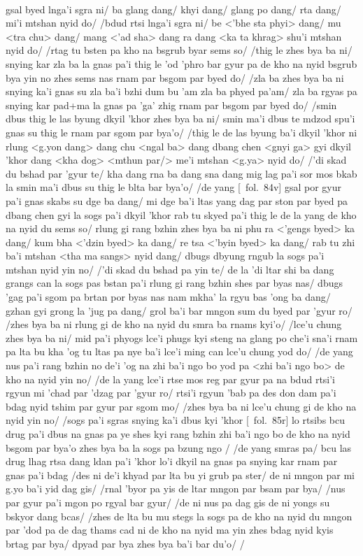 \documentclass[12pt]{article}
\begin{document}
\textbf{\TVB}\\
gsal byed lnga'i sgra ni/ ba glang dang/ khyi dang/ glang po dang/ rta dang/ mi'i mtshan nyid do/ /bdud rtsi lnga'i sgra ni/ be <'bhe sta phyi> dang/ mu <tra chu> dang/ mang <'ad sha> dang ra dang <ka ta khrag> shu'i mtshan nyid do/ /rtag tu bsten pa kho na bsgrub byar sems so/ /thig le zhes bya ba ni/ snying kar zla ba la gnas pa'i thig le 'od 'phro bar gyur pa de kho na nyid bsgrub bya yin no zhes sems nas rnam par bsgom par byed do/ /zla ba zhes bya ba ni snying ka'i gnas su zla ba'i bzhi dum bu 'am zla ba phyed pa'am/ zla ba rgyas pa snying kar pad+ma la gnas pa 'ga' zhig rnam par bsgom par byed do/ /smin dbus thig le las byung dkyil 'khor zhes bya ba ni/ smin ma'i dbus te mdzod spu'i gnas su thig le rnam par sgom par bya'o/ /thig le de las byung ba'i dkyil 'khor ni rlung <g.yon dang> dang chu <ngal ba> dang dbang chen <gnyi ga> gyi dkyil 'khor dang <kha dog> <mthun par/> me'i mtshan <g.ya> nyid do/ /'di skad du bshad par 'gyur te/ kha dang rna ba dang sna dang mig lag pa'i sor mos bkab la smin ma'i dbus su thig le blta bar bya'o/ /de yang [\TVB\ fol.\ 84v] gsal por gyur pa'i gnas skabs su dge ba dang/ mi dge ba'i ltas yang dag par ston par byed pa dbang chen gyi la sogs pa'i dkyil 'khor rab tu skyed pa'i thig le de la yang de kho na nyid du sems so/ rlung gi rang bzhin zhes bya ba ni phu ra <'gengs byed> ka dang/ kum bha <'dzin byed> ka dang/ re tsa <'byin byed> ka dang/ rab tu zhi ba'i mtshan <tha ma sangs> nyid dang/ dbugs dbyung rngub la sogs pa'i mtshan nyid yin no/ /'di skad du bshad pa yin te/ de la 'di ltar shi ba dang grangs can la sogs pas bstan pa'i rlung gi rang bzhin shes par byas nas/ dbugs 'gag pa'i sgom pa brtan por byas nas nam mkha' la rgyu bas 'ong ba dang/ gzhan gyi grong la 'jug pa dang/ grol ba'i bar mngon sum du byed par 'gyur ro/ /zhes bya ba ni rlung gi de kho na nyid du smra ba rnams kyi'o/ /lce'u chung zhes bya ba ni/ mid pa'i phyogs lce'i phugs kyi steng na glang po che'i sna'i rnam pa lta bu kha 'og tu ltas pa nye ba'i lce'i ming can lce'u chung yod do/ /de yang nus pa'i rang bzhin no de'i 'og na zhi ba'i ngo bo yod pa <zhi ba'i ngo bo> de kho na nyid yin no/ /de la yang lce'i rtse mos reg par gyur pa na bdud rtsi'i rgyun mi 'chad par 'dzag par 'gyur ro/ rtsi'i rgyun 'bab pa des don dam pa'i bdag nyid tshim par gyur par sgom mo/ /zhes bya ba ni lce'u chung gi de kho na nyid yin no/ /sogs pa'i sgras snying ka'i dbus kyi 'khor [\TVB\ fol.\ 85r] lo rtsibs bcu drug pa'i dbus na gnas pa ye shes kyi rang bzhin zhi ba'i ngo bo de kho na nyid bsgom par bya'o zhes bya ba la sogs pa bzung ngo / /de yang smras pa/ bcu las drug lhag rtsa dang ldan pa'i 'khor lo'i dkyil na gnas pa snying kar rnam par gnas pa'i bdag /des ni de'i khyad par lta bu yi grub pa ster/ de ni mngon par mi g.yo ba'i yid dag gis/ /rnal 'byor pa yis de ltar mngon par bsam par bya/ /nus par gyur pa'i mgon po rgyal bar gyur/ /de ni nus pa dag gis de ni yongs su bskyor dang bcas/ /zhes de lta bu mu stegs la sogs pa de kho na nyid du mngon par 'dod pa de dag thams cad ni de kho na nyid ma yin zhes bdag nyid kyis brtag par bya/ dpyad par bya zhes bya ba'i bar du'o/ /
\end{document}
